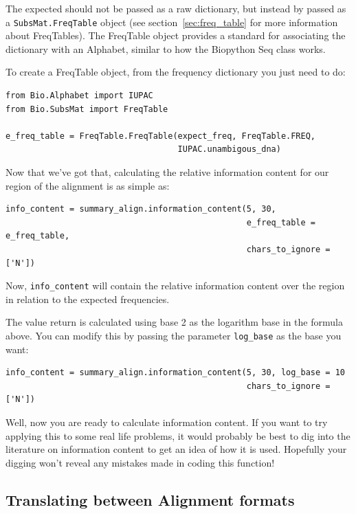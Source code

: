 \documentclass{report}
\begin{document}
The expected should not be passed as a raw dictionary, but instead by passed as a \verb|SubsMat.FreqTable| object (see section~\ref{sec:freq_table} for more information about FreqTables). The FreqTable object provides a standard for associating the dictionary with an Alphabet, similar to how the Biopython Seq class works. 


To create a FreqTable object, from the frequency dictionary you just need to do:

\begin{verbatim}
from Bio.Alphabet import IUPAC
from Bio.SubsMat import FreqTable

e_freq_table = FreqTable.FreqTable(expect_freq, FreqTable.FREQ,
                                   IUPAC.unambigous_dna)
\end{verbatim}

Now that we've got that, calculating the relative information content for our region of the alignment is as simple as:


\begin{verbatim}
info_content = summary_align.information_content(5, 30,
                                                 e_freq_table = e_freq_table,
                                                 chars_to_ignore = ['N'])
\end{verbatim}

Now, \verb|info_content| will contain the relative information content over the region in relation to the expected frequencies.


The value return is calculated using base 2 as the logarithm base in the formula above. You can modify this by passing the parameter \verb|log_base| as the base you want:

\begin{verbatim}
info_content = summary_align.information_content(5, 30, log_base = 10
                                                 chars_to_ignore = ['N'])
\end{verbatim}

Well, now you are ready to calculate information content. If you want to try applying this to some real life problems, it would probably be best to dig into the literature on information content to get an idea of how it is used. Hopefully your digging won't reveal any mistakes made in coding this function!

\subsection{Translating between Alignment formats}
\label{sec:align_translate}
\end{document}
